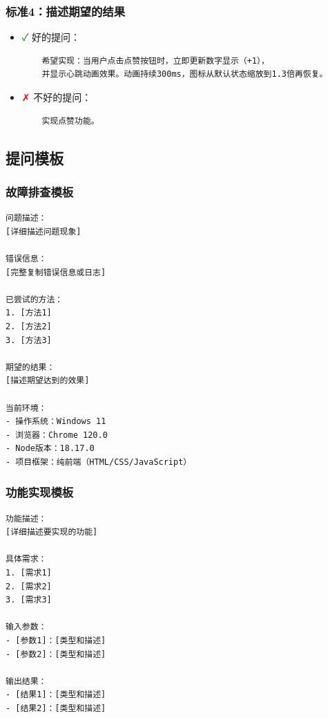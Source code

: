 \documentclass[12pt,a4paper]{article}
\begin{document}
\begin{itemize}
\subsubsection{标准4：描述期望的结果}

\begin{itemize}
    \item \textcolor{green}{✓} 好的提问：
    \begin{verbatim}
    希望实现：当用户点击点赞按钮时，立即更新数字显示（+1），
    并显示心跳动画效果。动画持续300ms，图标从默认状态缩放到1.3倍再恢复。
    \end{verbatim}

    \item \textcolor{red}{✗} 不好的提问：
    \begin{verbatim}
    实现点赞功能。
    \end{verbatim}
\end{itemize}

\subsection{提问模板}

\subsubsection{故障排查模板}

\begin{verbatim}
问题描述：
[详细描述问题现象]

错误信息：
[完整复制错误信息或日志]

已尝试的方法：
1. [方法1]
2. [方法2]
3. [方法3]

期望的结果：
[描述期望达到的效果]

当前环境：
- 操作系统：Windows 11
- 浏览器：Chrome 120.0
- Node版本：18.17.0
- 项目框架：纯前端（HTML/CSS/JavaScript）
\end{verbatim}

\subsubsection{功能实现模板}

\begin{verbatim}
功能描述：
[详细描述要实现的功能]

具体需求：
1. [需求1]
2. [需求2]
3. [需求3]

输入参数：
- [参数1]：[类型和描述]
- [参数2]：[类型和描述]

输出结果：
- [结果1]：[类型和描述]
- [结果2]：[类型和描述]


\end{verbatim}
\end{itemize}
\end{document}
